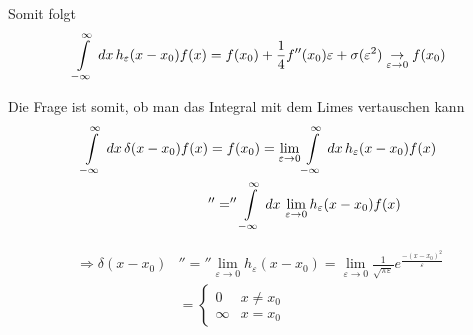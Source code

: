 Somit folgt
\begin{align}
\int \limits_{-\infty}^{\infty}\,dx\, h_{\varepsilon}(x-x_0)f(x) = f(x_0) +
\frac{1}{4} f''(x_0)\varepsilon + \sigma(\varepsilon^2) \underset{\varepsilon\to0}{\rightarrow} f(x_0)
\end{align}

Die Frage ist somit, ob man das Integral mit dem Limes vertauschen kann
\begin{align*}
\int \limits_{-\infty}^{\infty}\,dx\, \delta(x-x_0) f(x) &= f(x_0) =
\lim_{\varepsilon\to0} \int \limits_{-\infty}^{\infty}\,dx\, h_{\varepsilon}(x-x_0)
f(x)\\
&''='' \int \limits_{-\infty}^{\infty} \,dx\, \lim_{\varepsilon\to0}
h_{\varepsilon}(x-x_0)f(x)
\end{align*}

\begin{align*}
\Rightarrow \delta(x-x_0) &''='' \lim_{\varepsilon\to0} h_{\varepsilon}(x-x_0)
=
\lim_{\varepsilon\to0}
\frac{1}{\sqrt{\pi\varepsilon}} e^{\frac{-(x-x_0)^2}{\varepsilon}}\\
& = \begin{cases}0 & x\neq x_0\\\infty & x = x_0\end{cases}
\end{align*}

